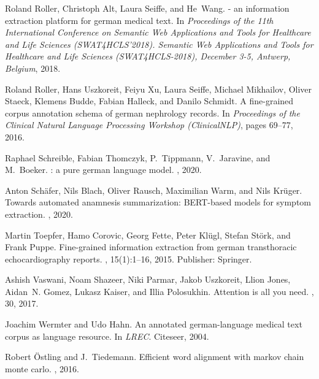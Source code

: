 \documentclass[runningheads]{llncs}
\begin{document}
\begin{thebibliography}{10}
Roland Roller, Christoph Alt, Laura Seiffe, and He~Wang.
 - an information extraction platform for german medical text.
\newblock In {\em Proceedings of the 11th International Conference on Semantic
  Web Applications and Tools for Healthcare and Life Sciences
  ({SWAT}4HCLS'2018). Semantic Web Applications and Tools for Healthcare and
  Life Sciences ({SWAT}4HCLS-2018), December 3-5, Antwerp, Belgium}, 2018.

Roland Roller, Hans Uszkoreit, Feiyu Xu, Laura Seiffe, Michael Mikhailov,
  Oliver Staeck, Klemens Budde, Fabian Halleck, and Danilo Schmidt.
\newblock A fine-grained corpus annotation schema of german nephrology records.
\newblock In {\em Proceedings of the Clinical Natural Language Processing
  Workshop ({ClinicalNLP})}, pages 69--77, 2016.

Raphael Schreible, Fabian Thomczyk, P.~Tippmann, V.~Jaravine, and M.~Boeker.
: a pure german language model.
, 2020.

Anton Schäfer, Nils Blach, Oliver Rausch, Maximilian Warm, and Nils Krüger.
\newblock Towards automated anamnesis summarization: {BERT}-based models for
  symptom extraction.
, 2020.

Martin Toepfer, Hamo Corovic, Georg Fette, Peter Klügl, Stefan Störk, and
  Frank Puppe.
\newblock Fine-grained information extraction from german transthoracic
  echocardiography reports.
, 15(1):1--16,
  2015.
\newblock Publisher: Springer.

Ashish Vaswani, Noam Shazeer, Niki Parmar, Jakob Uszkoreit, Llion Jones,
  Aidan~N. Gomez, Lukasz Kaiser, and Illia Polosukhin.
\newblock Attention is all you need.
, 30, 2017.

Joachim Wermter and Udo Hahn.
\newblock An annotated german-language medical text corpus as language
  resource.
\newblock In {\em {LREC}}. Citeseer, 2004.

Robert Östling and J.~Tiedemann.
\newblock Efficient word alignment with markov chain monte carlo.
, 2016.

\end{thebibliography}
\end{document}
